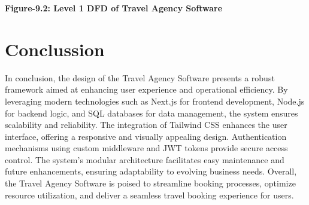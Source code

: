 \documentclass{scrreprt}
\begin{document}
\begin{center}
    \parbox{0.8\textwidth}{ 
        \centering
        \textbf{Figure-9.2: Level 1 DFD of Travel Agency Software}
    }
\end{center}

\chapter{Conclussion}

In conclusion, the design of the Travel Agency Software presents a robust framework aimed at enhancing user experience and operational efficiency. By leveraging modern technologies such as Next.js for frontend development, Node.js for backend logic, and SQL databases for data management, the system ensures scalability and reliability. The integration of Tailwind CSS enhances the user interface, offering a responsive and visually appealing design. Authentication mechanisms using custom middleware and JWT tokens provide secure access control. The system's modular architecture facilitates easy maintenance and future enhancements, ensuring adaptability to evolving business needs. Overall, the Travel Agency Software is poised to streamline booking processes, optimize resource utilization, and deliver a seamless travel booking experience for users.
\end{document}
